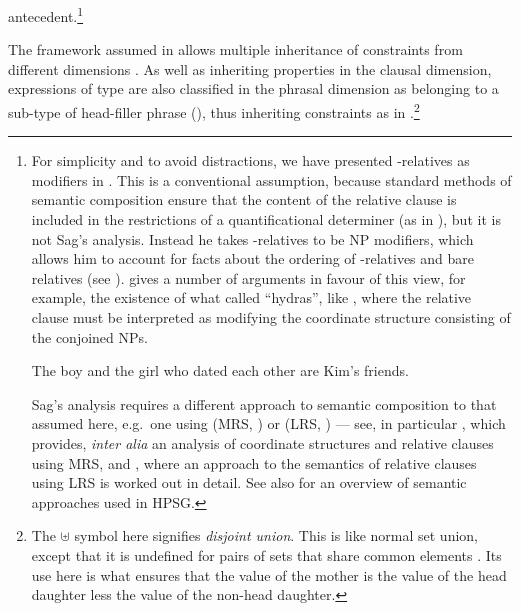 \documentclass[output=paper
 	        ,biblatex
                ,babelshorthands
                ,newtxmath
                ,draftmode
                ,colorlinks, citecolor=brown
]{langscibook}
\begin{document}
antecedent.\footnote{\label{fn:rc-2}For simplicity and to avoid distractions, we have
  presented -relatives as  modifiers in . This is a conventional
  assumption, because standard methods of semantic composition ensure that the content of
  the relative clause is included in the restrictions of a quantificational determiner (as
  in ), but it is not Sag's analysis. Instead he takes
  -relatives to be NP modifiers, which allows him to account for facts about the
  ordering of -relatives and bare relatives (see
  \citealt[465--469]{Sag:97}). \citet[293--294]{Kiss2005a} gives a number of arguments in
  favour of this view, for example, the existence of what \citet{Link84a-u} called
  ``hydras'', like , where the relative clause must be interpreted as modifying
  the coordinate structure consisting of the conjoined NPs.
  \begin{exe}
    \ex\label{x:rc-45} The boy and the girl who dated each other are
    Kim's friends.
  \end{exe}
  Sag's analysis requires a different approach to semantic composition to that assumed
  here, e.g.\ one using  (MRS, \citealt{CFPS2005a}) or  (LRS, \citealt{richtersailer-lrs04}) --- see, in  particular
  , which provides, \emph{inter alia} an analysis of coordinate structures and
  relative clauses using MRS, and , where an approach to the semantics of relative
  clauses using LRS is worked out in detail. See also  for an overview
  of semantic approaches used in HPSG.}
\begin{exe}\ex\label{x:rc-46}
 \end{exe}
The framework assumed in  allows multiple inheritance of
constraints from different dimensions \crossrefchapterp[\pageref{properties:page-cross-classification-of-lexemes}]{properties}. As well
as inheriting properties in the clausal dimension, expressions of type  are
also classified in the phrasal dimension as belonging to a sub-type of head-filler phrase
(), thus inheriting constraints as in .\footnote{\label{fn-disjoint-set-union}The
  $\uplus$ symbol here signifies \emph{disjoint union}. This is like normal set union,
  except that it is undefined for pairs of sets that share common elements \citep[445]{Sag97a}. Its use here
  is what ensures that the  value of the mother is the  value of the
  head daughter less the  value of the non-head daughter.}
\end{document}
